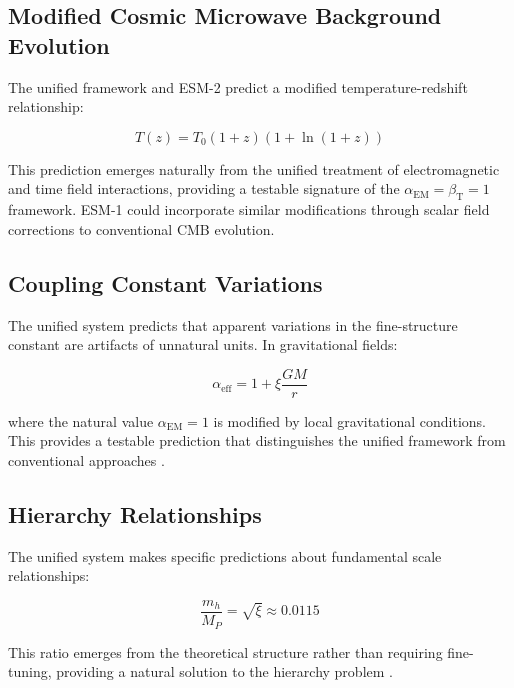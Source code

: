\documentclass[12pt,a4paper]{article}
\newcommand{\alphaEM}{\alpha_{\text{EM}}}
\newcommand{\betaT}{\beta_{\text{T}}}
\newcommand{\xipar}{\xi}
\begin{document}
	\subsection{Modified Cosmic Microwave Background Evolution}
	\label{subsec:cmb_evolution}
	
	The unified framework and ESM-2 predict a modified temperature-redshift relationship:
	
	\begin{equation}
		T(z) = T_0(1+z)(1+\ln(1+z))
	\end{equation}
	
	This prediction emerges naturally from the unified treatment of electromagnetic and time field interactions, providing a testable signature of the $\alphaEM = \betaT = 1$ framework. ESM-1 could incorporate similar modifications through scalar field corrections to conventional CMB evolution.
	
	\subsection{Coupling Constant Variations}
	\label{subsec:coupling_variations}
	
	The unified system predicts that apparent variations in the fine-structure constant are artifacts of unnatural units. In gravitational fields:
	
	\begin{equation}
		\alpha_{\text{eff}} = 1 + \xipar \frac{GM}{r}
	\end{equation}
	
	where the natural value $\alphaEM = 1$ is modified by local gravitational conditions. This provides a testable prediction that distinguishes the unified framework from conventional approaches \cite{Will2014,Webb2001}.
	
	\subsection{Hierarchy Relationships}
	\label{subsec:hierarchy_relationships}
	
	The unified system makes specific predictions about fundamental scale relationships:
	
	\begin{equation}
		\frac{m_h}{M_P} = \sqrt{\xipar} \approx 0.0115
	\end{equation}
	
	This ratio emerges from the theoretical structure rather than requiring fine-tuning, providing a natural solution to the hierarchy problem \cite{pascher_beta_derivation_2025}.
	
\end{document}
